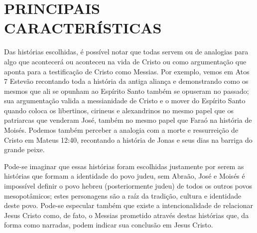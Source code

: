 \documentclass[
    article,            %
	12pt,				%
	oneside,			%
	a4paper,			%
	chapter=TITLE,		%
	section=TITLE,		%
	english,			%
	french,				%
	spanish,			%
	brazil				%
	]{abntex2}
\begin{document}
\section*{PRINCIPAIS CARACTERÍSTICAS}
Das histórias escolhidas, é possível notar que todas servem ou de analogias para algo que acontecerá ou aconteceu na vida de Cristo ou como argumentação que aponta para a testificação de Cristo como Messias. Por exemplo, vemos em Atos 7 Estevão recontando toda a história da antiga aliança e demonstrando como os mesmos que ali se opunham ao Espírito Santo também se opuseram no passado; sua argumentação valida a messianidade de Cristo e o mover do Espírito Santo quando coloca os libertinos, cirineus e alexandrinos no mesmo papel que os patriarcas que venderam José, também no mesmo papel que Faraó na história de Moisés. Podemos também perceber a analogia com a morte e ressurreição de Cristo em Mateus 12:40, recontando a história de Jonas e seus dias na barriga do grande peixe.

Pode-se imaginar que essas histórias foram escolhidas justamente por serem as histórias que formam a identidade do povo judeu, sem Abraão, José e Moisés é impossível definir o povo hebreu (posteriormente judeu) de todos os outros povos mesopotâmicos; estes personagens são a raíz da tradição, cultura e identidade deste povo. Pode-se especular também que existe a intencionalidade de relacionar Jesus Cristo como, de fato, o Messias prometido através destas histórias que, da forma como narradas, podem indicar sua conclusão em Jesus Cristo.

% 
\end{document}

